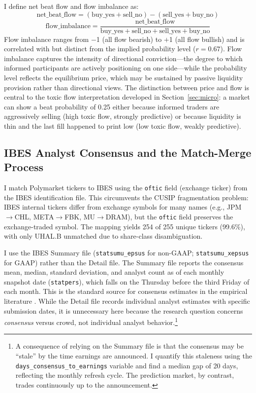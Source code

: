 \documentclass[11pt]{article}
\begin{document}
I define net beat flow and flow imbalance as:
\begin{equation}
\text{net\_beat\_flow} = (\text{buy\_yes} + \text{sell\_no}) - (\text{sell\_yes} + \text{buy\_no})
\end{equation}
\begin{equation}
\text{flow\_imbalance} = \frac{\text{net\_beat\_flow}}{\text{buy\_yes} + \text{sell\_no} + \text{sell\_yes} + \text{buy\_no}}
\end{equation}
Flow imbalance ranges from $-$1 (all flow bearish) to $+$1 (all flow bullish) and is correlated with but distinct from the implied probability level ($r = 0.67$). Flow imbalance captures the intensity of directional conviction---the degree to which informed participants are actively positioning on one side---while the probability level reflects the equilibrium price, which may be sustained by passive liquidity provision rather than directional views. The distinction between price and flow is central to the toxic flow interpretation developed in Section~\ref{sec:micro}: a market can show a beat probability of 0.25 either because informed traders are aggressively selling (high toxic flow, strongly predictive) or because liquidity is thin and the last fill happened to print low (low toxic flow, weakly predictive).

\subsection{IBES Analyst Consensus and the Match-Merge Process}

I match Polymarket tickers to IBES using the \texttt{oftic} field (exchange ticker) from the IBES identification file. This circumvents the CUSIP fragmentation problem: IBES internal tickers differ from exchange symbols for many names (e.g., JPM$\to$CHL, META$\to$FBK, MU$\to$DRAM), but the \texttt{oftic} field preserves the exchange-traded symbol. The mapping yields 254 of 255 unique tickers (99.6\%), with only UHAL.B unmatched due to share-class disambiguation.

I use the IBES Summary file (\texttt{statsumu\_epsus} for non-GAAP; \texttt{statsumu\_xepsus} for GAAP) rather than the Detail file. The Summary file reports the consensus mean, median, standard deviation, and analyst count as of each monthly snapshot date (\texttt{statpers}), which falls on the Thursday before the third Friday of each month. This is the standard source for consensus estimates in the empirical literature \citep{richardson2004walk, matsumoto2002management}. While the Detail file records individual analyst estimates with specific submission dates, it is unnecessary here because the research question concerns \textit{consensus} versus crowd, not individual analyst behavior.\footnote{A consequence of relying on the Summary file is that the consensus may be ``stale'' by the time earnings are announced. I quantify this staleness using the \texttt{days\_consensus\_to\_earnings} variable and find a median gap of 20 days, reflecting the monthly refresh cycle. The prediction market, by contrast, trades continuously up to the announcement.}
\end{document}
